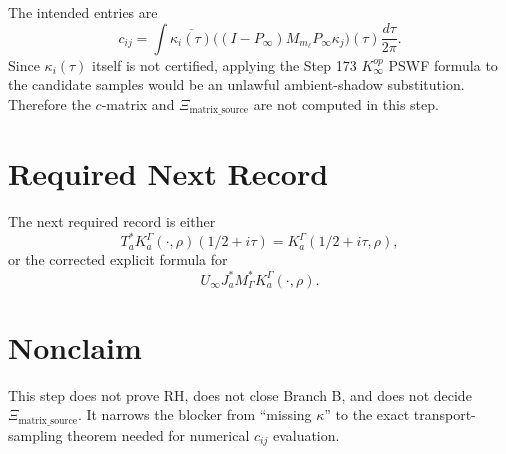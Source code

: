 \documentclass[11pt]{article}
\begin{document}
The intended entries are
\[
c_{ij}=\int \overline{\kappa_i(\tau)}
\bigl((I-P_\infty)M_{m_\ell}P_\infty\kappa_j\bigr)(\tau)
\frac{d\tau}{2\pi}.
\]
Since \(\kappa_i(\tau)\) itself is not certified, applying the Step 173
\(K_\infty^{op}\) PSWF formula to the candidate samples would be an
unlawful ambient-shadow substitution.  Therefore the \(c\)-matrix and
\(\Xi_{\mathrm{matrix\_source}}\) are not computed in this step.

\section*{Required Next Record}

The next required record is either
\[
T_a^*K_a^\Gamma(\cdot,\rho)(1/2+i\tau)
=K_a^\Gamma(1/2+i\tau,\rho),
\]
or the corrected explicit formula for
\[
U_\infty J_a^*M_\Gamma^*K_a^\Gamma(\cdot,\rho).
\]

\section*{Nonclaim}

This step does not prove RH, does not close Branch B, and does not decide
\(\Xi_{\mathrm{matrix\_source}}\).  It narrows the blocker from ``missing
\(\kappa\)'' to the exact transport-sampling theorem needed for numerical
\(c_{ij}\) evaluation.
\end{document}
